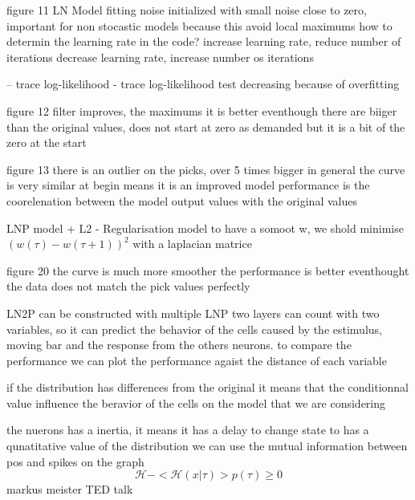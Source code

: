 \documentclass{article}
\begin{document}
figure 11
LN Model fitting
noise initialized with small noise close to zero, important for non stocastic models because this avoid local maximums
how to determin the learning rate in the code?
increase learning rate, reduce number of iterations
decrease learning rate, increase number os iterations

-- trace log-likelihood
- trace log-likelihood test decreasing because of overfitting

figure 12
filter
improves, the maximums it is better eventhough there are biiger than the original values, does not start at zero as demanded but it is a bit of the zero at the start

figure 13
there is an outlier on the picks, over 5 times bigger
in general the curve is very similar at begin means it is an improved model
performance is the coorelenation between the model output values with the original values



LNP model + L2 - Regularisation model
to have a somoot w, we shold minimise $(w(\tau) - w(\tau + 1))^2$
with a laplacian matrice 

figure 20
the curve is much more smoother
the performance is better eventhought the data does not match the pick values perfectly

LN2P can be constructed with multiple LNP
two layers can count with two variables, so it can predict the behavior of the cells caused by the estimulus, moving bar and the response from the others neurons. to compare the performance we can plot the performance agaist the distance of each variable

if the distribution has differences from the original it means that the conditionnal value influence the beravior of the cells on the model that we are considering

the nuerons has a inertia, it means it has a delay to change state
to has a qunatitative value of the distribution we can use the mutual information between pos and spikes on the graph
\begin{equation}
    \mathcal{H} - <\mathcal{H}(x|\tau)> p(\tau) \geq 0
\end{equation}
markus meister TED talk
\end{document}
